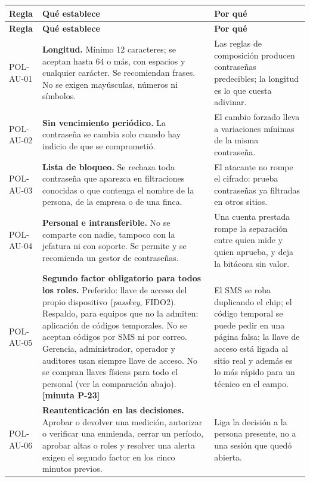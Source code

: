 \documentclass[11pt,letterpaper]{article}
\newcommand{\cab}[1]{\textbf{\rmfamily #1}}
\newcommand{\resp}[1]{\textrm{\footnotesize\bfseries [minuta #1]}}
\begin{document}
{\small
\renewcommand{\arraystretch}{1.14}
\begin{longtable}{@{}L{1.7cm} L{9.2cm} L{4.8cm}@{}}
\toprule
\cab{Regla} & \cab{Qué establece} & \cab{Por qué} \\
\midrule
\endfirsthead
\toprule
\cab{Regla} & \cab{Qué establece} & \cab{Por qué} \\
\midrule
\endhead
\bottomrule
\endfoot
POL-AU-01 & \textbf{Longitud.} Mínimo 12 caracteres; se aceptan hasta 64 o más, con espacios y cualquier carácter. Se recomiendan frases. No se exigen mayúsculas, números ni símbolos. & Las reglas de composición producen contraseñas predecibles; la longitud es lo que cuesta adivinar. \\
POL-AU-02 & \textbf{Sin vencimiento periódico.} La contraseña se cambia solo cuando hay indicio de que se comprometió. & El cambio forzado lleva a variaciones mínimas de la misma contraseña. \\
POL-AU-03 & \textbf{Lista de bloqueo.} Se rechaza toda contraseña que aparezca en filtraciones conocidas o que contenga el nombre de la persona, de la empresa o de una finca. & El atacante no rompe el cifrado: prueba contraseñas ya filtradas en otros sitios. \\
POL-AU-04 & \textbf{Personal e intransferible.} No se comparte con nadie, tampoco con la jefatura ni con soporte. Se permite y se recomienda un gestor de contraseñas. & Una cuenta prestada rompe la separación entre quien mide y quien aprueba, y deja la bitácora sin valor. \\
POL-AU-05 & \textbf{Segundo factor obligatorio para todos los roles.} Preferido: llave de acceso del propio dispositivo (\emph{passkey}, FIDO2). Respaldo, para equipos que no la admiten: aplicación de códigos temporales. No se aceptan códigos por SMS ni por correo. Gerencia, administrador, operador y auditores usan siempre llave de acceso. No se compran llaves físicas para todo el personal (ver la comparación abajo). \resp{P-23} & El SMS se roba duplicando el chip; el código temporal se puede pedir en una página falsa; la llave de acceso está ligada al sitio real y además es lo más rápido para un técnico en el campo. \\
POL-AU-06 & \textbf{Reautenticación en las decisiones.} Aprobar o devolver una medición, autorizar o verificar una enmienda, cerrar un período, aprobar altas o roles y resolver una alerta exigen el segundo factor en los cinco minutos previos. & Liga la decisión a la persona presente, no a una sesión que quedó abierta. \\

\end{longtable}}
\end{document}
